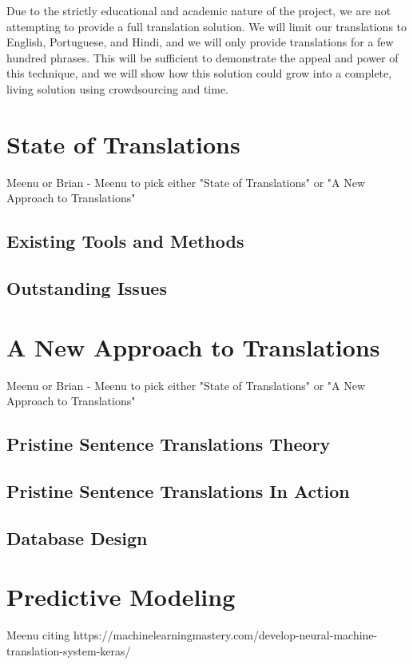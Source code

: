 \documentclass{llncs}
\begin{document}
	Due to the strictly educational and academic nature of the project, we are not attempting to provide a full translation solution. We will limit our translations to English, Portuguese, and Hindi, and we will only provide translations for a few hundred phrases. This will be sufficient to demonstrate the appeal and power of this technique, and we will show how this solution could grow into a complete, living solution using crowdsourcing and time. 
	
	\section{State of Translations}
	Meenu or Brian - Meenu to pick either "State of Translations" or "A New Approach to Translations"
	
	\subsection{Existing Tools and Methods}
	
	\subsection{Outstanding Issues}
	
	\section{A New Approach to Translations}
	Meenu or Brian - Meenu to pick either "State of Translations" or "A New Approach to Translations"
	
	\subsection{Pristine Sentence Translations Theory}
	
	\subsection{Pristine Sentence Translations In Action}
	
	\subsection{Database Design}
	
	\section{Predictive Modeling}
	Meenu citing https://machinelearningmastery.com/develop-neural-machine-translation-system-keras/
	
\end{document}
